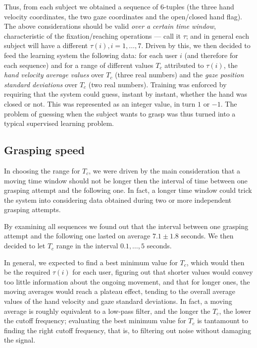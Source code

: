 \documentclass[jou,a4paper,notxfonts]{apa}
\begin{document}
Thus, from each subject we obtained a sequence of $6$-tuples (the
three hand velocity coordinates, the two gaze coordinates and the
open/closed hand flag). The above considerations should be valid
\emph{over a certain time window}, characteristic of the
fixation/reaching operations --- call it $\tau$; and in general each
subject will have a different $\tau(i), i=1,\ldots,7$. Driven by this,
we then decided to feed the learning system the following data: for
each user $i$ (and therefore for each sequence) and for a range of
different values $T_c$ attributed to $\tau(i)$, the \emph{hand
velocity average values} over $T_c$ (three real numbers) and the
\emph{gaze position standard deviations} over $T_c$ (two real
numbers). Training was enforced by requiring that the system could
guess, instant by instant, whether the hand was closed or not. This
was represented as an integer value, in turn $1$ or $-1$. The problem
of guessing when the subject wants to grasp was thus turned into a
typical supervised learning problem.

\subsection{Grasping speed}

In choosing the range for $T_c$, we were driven by the main
consideration that a moving time window should not be longer then the
interval of time between one grasping attempt and the following
one. In fact, a longer time window could trick the system into
considering data obtained during two or more independent grasping
attempts.

By examining all sequences we found out that the interval between one
grasping attempt and the following one lasted on average $7.1 \pm 1.8$
seconds. We then decided to let $T_c$ range in the interval
$0.1,\ldots,5$ seconds.

In general, we expected to find a best minimum value for $T_c$, which
would then be the required $\tau(i)$ for each user, figuring out that
shorter values would convey too little information about the ongoing
movement, and that for longer ones, the moving averages would reach a
plateau effect, tending to the overall average values of the hand
velocity and gaze standard deviations. In fact, a moving average is
roughly equivalent to a low-pass filter, and the longer the $T_c$, the
lower the cutoff frequency; evaluating the best minimum value for
$T_c$ is tantamount to finding the right cutoff frequency, that is, to
filtering out noise without damaging the signal.
\end{document}
